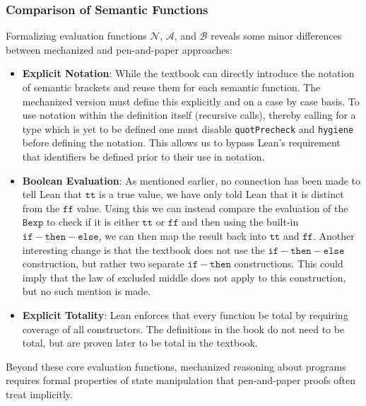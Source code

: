 \vspace{1em}


\subsubsection*{Comparison of Semantic Functions}
Formalizing evaluation functions $\mathcal{N}$, $\mathcal{A}$, and $\mathcal{B}$ reveals some minor differences
between mechanized and pen-and-paper approaches:
\begin{itemize}
    \item \textbf{Explicit Notation}:
    While the textbook can directly introduce the notation of semantic brackets
    and reuse them for each semantic function.
    The mechanized version must define this explicitly and on a case by case basis.
    To use notation within the definition itself (recursive calls), thereby calling for a type which is yet to be defined one must disable
    \texttt{quotPrecheck} and \texttt{hygiene} before defining the notation.
    This allows us to bypass Lean's requirement that identifiers be defined
    prior to their use in notation.

    \item \textbf{Boolean Evaluation}:
    As mentioned earlier, no connection has been made to tell Lean that \(\mathtt{tt}\) is a true value,
    we have only told Lean that it is distinct from the \(\mathtt{ff}\) value.
    Using this we can instead compare the evaluation of the \(\mathtt{Bexp}\) to check if it is either
    \(\mathtt{tt}\) or \(\mathtt{ff}\) and then using the built-in \(\mathtt{if-then-else}\),
    we can then map the result back into \(\mathtt{tt}\) and \(\mathtt{ff}\).
    Another interesting change is that the textbook does not use the \(\mathtt{if-then-else}\) construction,
    but rather two separate \(\mathtt{if-then}\) constructions. This could imply that the law of excluded middle
    does not apply to this construction, but no such mention is made.

    \item \textbf{Explicit Totality}:
    Lean enforces that every function be total by requiring coverage of
    all constructors. The definitions in the book do not need to be total,
    but are proven later to be total in the textbook.
\end{itemize}
\noindent
Beyond these core evaluation functions, mechanized reasoning about
programs requires formal properties of state manipulation that
pen-and-paper proofs often treat implicitly.

